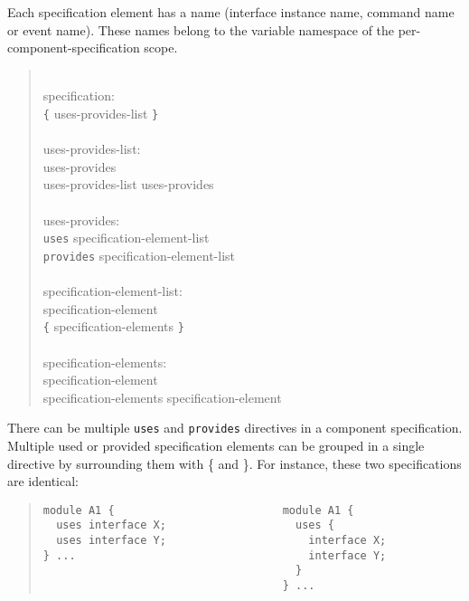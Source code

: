 \documentclass[11pt,letterpaper]{article}
\newcommand{\kw}[1]{{\tt #1}}
\newcommand{\grammarshift}{\vspace*{-.7cm}}
\newcommand{\grammarindent}{\hspace*{2cm}\= \\ \kill}
\begin{document}
Each specification element has a name (interface instance name, command
name or event name). These names belong to the variable namespace of the
per-component-specification scope.  
\begin{quote} \grammarshift \em \begin{tabbing}
\grammarindent
specification:\\
\>	\kw{\{} uses-provides-list \kw{\}}\\
\\
uses-provides-list:\\
\>	uses-provides\\
\>	uses-provides-list uses-provides\\
\\
uses-provides:\\
\>	\kw{uses} specification-element-list\\
\>	\kw{provides} specification-element-list\\
\\
specification-element-list:\\
\>	specification-element\\
\>	\kw{\{} specification-elements \kw{\}}\\
\\
specification-elements:\\
\>	specification-element\\
\>	specification-elements specification-element\\
\end{tabbing} \end{quote}
There can be multiple \kw{uses} and \kw{provides} directives in a component
specification. Multiple used or provided specification elements can be
grouped in a single directive by surrounding them with \{ and \}. For
instance, these two specifications are identical:

\begin{quote} \begin{verbatim}
module A1 {                          module A1 {      
  uses interface X;                    uses {         
  uses interface Y;                      interface X; 
} ...                                    interface Y; 
                                       }              
                                     } ...            
\end{verbatim} \end{quote}
\end{document}
